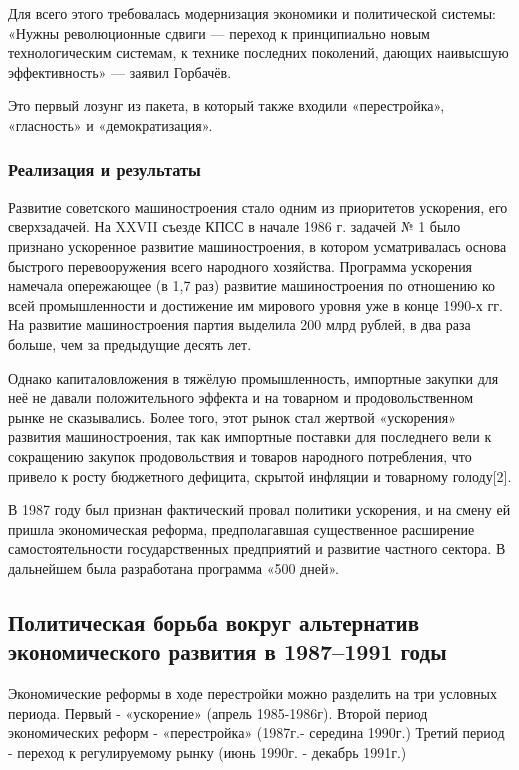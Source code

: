\documentclass{article}
\begin{document}
Для всего этого требовалась модернизация экономики и политической системы: «Нужны революционные сдвиги — переход к принципиально новым технологическим системам, к технике последних поколений, дающих наивысшую эффективность» — заявил Горбачёв.

\hfill

Это первый лозунг из пакета, в который также входили «перестройка», «гласность» и «демократизация». 

\subsubsection{Реализация и результаты}

Развитие советского машиностроения стало одним из приоритетов ускорения, его сверхзадачей. На XXVII съезде КПСС в начале 1986 г. задачей № 1 было признано ускоренное развитие машиностроения, в котором усматривалась основа быстрого перевооружения всего народного хозяйства. Программа ускорения намечала опережающее (в 1,7 раз) развитие машиностроения по отношению ко всей промышленности и достижение им мирового уровня уже в конце 1990-х гг. На развитие машиностроения партия выделила 200 млрд рублей, в два раза больше, чем за предыдущие десять лет.

\hfill

Однако капиталовложения в тяжёлую промышленность, импортные закупки для неё не давали положительного эффекта и на товарном и продовольственном рынке не сказывались. Более того, этот рынок стал жертвой «ускорения» развития машиностроения, так как импортные поставки для последнего вели к сокращению закупок продовольствия и товаров народного потребления, что привело к росту бюджетного дефицита, скрытой инфляции и товарному голоду[2].

\hfill

В 1987 году был признан фактический провал политики ускорения, и на смену ей пришла экономическая реформа, предполагавшая существенное расширение самостоятельности государственных предприятий и развитие частного сектора. В дальнейшем была разработана программа «500 дней».

\pagebreak
\subsection{Политическая борьба вокруг альтернатив экономического развития в 1987–1991 годы}

Экономические реформы в ходе перестройки можно разделить на три условных периода. Первый - «ускорение» (апрель 1985-1986г). Второй период экономических реформ - «перестройка» (1987г.- середина 1990г.) Третий период - переход к регулируемому рынку (июнь 1990г. - декабрь 1991г.)
\end{document}
